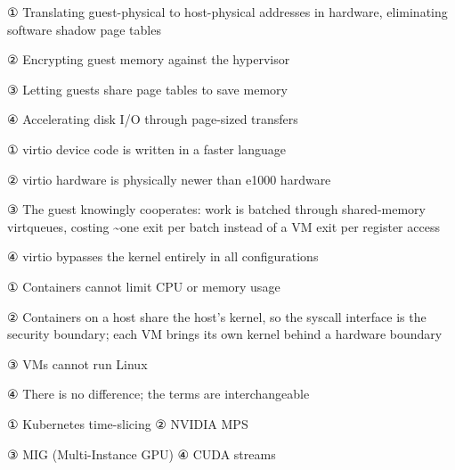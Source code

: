 
\begin{tbboptions}
  \item ① Translating guest-physical to host-physical addresses in hardware, eliminating software shadow page tables
  \item ② Encrypting guest memory against the hypervisor
  \item ③ Letting guests share page tables to save memory
  \item ④ Accelerating disk I/O through page-sized transfers
\end{tbboptions}


\begin{tbboptions}
  \item ① virtio device code is written in a faster language
  \item ② virtio hardware is physically newer than e1000 hardware
  \item ③ The guest knowingly cooperates: work is batched through shared-memory virtqueues, costing \textasciitilde{}one exit per batch instead of a VM exit per register access
  \item ④ virtio bypasses the kernel entirely in all configurations
\end{tbboptions}


\begin{tbboptions}
  \item ① Containers cannot limit CPU or memory usage
  \item ② Containers on a host share the host's kernel, so the syscall interface is the security boundary; each VM brings its own kernel behind a hardware boundary
  \item ③ VMs cannot run Linux
  \item ④ There is no difference; the terms are interchangeable
\end{tbboptions}


\begin{tbboptions}
  \item ① Kubernetes time-slicing        ② NVIDIA MPS
  \item ③ MIG (Multi-Instance GPU)      ④ CUDA streams
\end{tbboptions}


